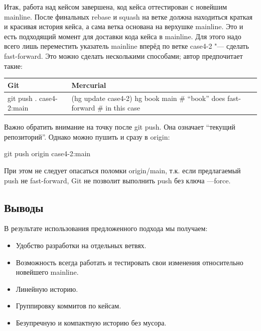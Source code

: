 \documentclass[10pt, a5paper]{article}
\begin{document}
Итак, работа над кейсом завершена, код кейса оттестирован с новейшим mainline. После финальных rebase и squash на ветке должна находиться краткая и красивая история кейса, а сама ветка основана на верхушке mainline. Это и есть подходящий момент для доставки кода кейса в mainline. Для этого надо всего лишь переместить указатель mainline вперёд по ветке case4-2 "--- сделать fast-forward. Это можно сделать несколькими способами; автор предпочитает такие:

\begin{table}
  \centering
  \begin{tabular}{P{3.5cm}|P{6cm}} \hline
    \textbf{Git}                       & \textbf{Mercurial}            \\ \hline
     git push . case4-2:main      & (hg update case4-2) \linebreak
                               hg book main \linebreak  \# ``book'' does fast-forward \linebreak
                               \# in this case                                               \\ \hline
  \end{tabular}
\end{table}
Важно обратить внимание на точку после git push. Она означает ``текущий репозиторий''. Однако можно пушить и сразу в origin:

git push origin case4-2:main

При этом не следует опасаться поломки origin/main, т.к. если предлагаемый push не fast-forward, Git не позволит выполнить push без ключа ---force.

\subsection*{Выводы}

В результате использования предложенного подхода мы получаем:

\begin{itemize}
  \item Удобство разработки на отдельных ветвях.
  \item Возможность всегда работать и тестировать свои изменения относительно новейшего mainline.
  \item Линейную историю.
  \item Группировку коммитов по кейсам.
  \item Безупречную и компактную историю без мусора.
\end{itemize}
\end{document}
